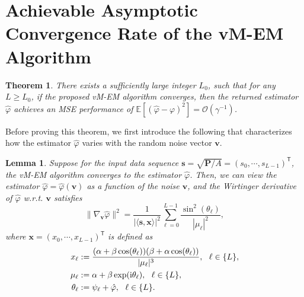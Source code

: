 \documentclass[a4paper,12pt]{article}
\newtheorem{theorem}{\bf Theorem}
\newtheorem{lemma}{\bf Lemma}
\def \T {^{\mathsf{T}}}
\def \ri {{\rm i}}
\begin{document}
\section{Achievable Asymptotic Convergence Rate of the vM-EM Algorithm}

\begin{theorem} \label{thm:asymp_perf_vM-EM}
    There exists a sufficiently large integer $L_0$, such that for any $L\geq L_0$, if the proposed vM-EM algorithm converges, then the returned estimator $\hat{\varphi}$ achieves an MSE performance of $\mathbb{E}[(\hat{\varphi}-\varphi)^2] = \mathcal{O}(\gamma^{-1})$.  
\end{theorem}

Before proving this theorem, we first introduce the following that characterizes how the estimator $\hat{\varphi}$ varies with the random noise vector $\bm v$. 

\begin{lemma} \label{lemma_Wirtinger_derivative_of_vM-EM_estimator}
    Suppose for the input data sequence ${\bm s} = \sqrt{{\bm P}/A} = (s_0, \cdots, s_{L-1})\T$, the vM-EM algorithm converges to the estimator $\hat{\varphi}$. Then, we can view the estimator $\hat{\varphi} = \hat{\varphi}({\bm v})$ as a function of the noise $\bm v$, and the Wirtinger derivative of $\hat{\varphi}$ w.r.t. $\bm v$ satisfies 
    \begin{equation}
        \|\nabla_{\bm v}\hat{\varphi}\|^2 = \frac{1}{|\langle {\bm s}, {\bm x}\rangle|^2}\sum_{\ell=0}^{L-1}  \frac{\sin^2(\theta_\ell)}{|\mu_\ell|^2}, 
    \end{equation} 
    where ${\bm x} = (x_0, \cdots, x_{L-1})\T$ is defined as 
    \begin{equation}
        \begin{aligned}
        x_{\ell} &:= \frac{(\alpha+\beta \cos(\theta_\ell))(\beta+\alpha\cos(\theta_\ell))}{|\mu_\ell|^3},~~\ell\in\{L\}, \\
        \mu_\ell & := \alpha+\beta \exp(\ri \theta_\ell),~~\ell\in\{L\}, \\
        \theta_\ell & := \psi_\ell + \hat{\varphi}, ~~\ell\in\{L\}.\\
        \end{aligned}
    \end{equation}
\end{lemma}
\end{document}
